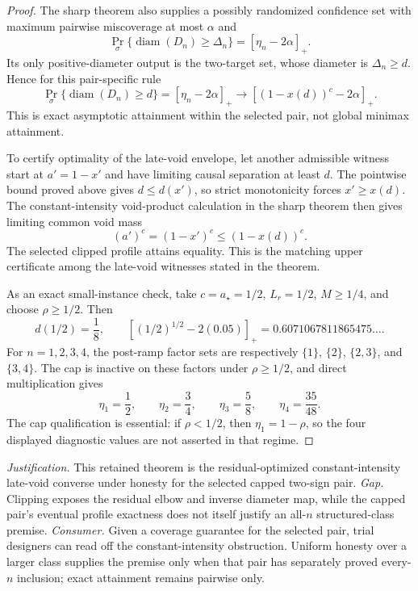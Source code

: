 \documentclass{article}
\begin{document}
\begin{proof}
The sharp theorem also supplies a possibly randomized confidence set with maximum pairwise miscoverage at most \(\alpha\) and
\[
 \Pr_\sigma\{\operatorname{diam}(D_n)\ge\Delta_n\}
 =[\eta_n-2\alpha]_+.
\]
Its only positive-diameter output is the two-target set, whose diameter is \(\Delta_n\ge d\).  Hence for this pair-specific rule
\[
 \Pr_\sigma\{\operatorname{diam}(D_n)\ge d\}
 =[\eta_n-2\alpha]_+
 \longrightarrow[(1-x(d))^c-2\alpha]_+.
\]
This is exact asymptotic attainment within the selected pair, not global minimax attainment.

To certify optimality of the late-void envelope, let another admissible witness start at \(a'=1-x'\) and have limiting causal separation at least \(d\).  The pointwise bound proved above gives \(d\le d(x')\), so strict monotonicity forces \(x'\ge x(d)\).  The constant-intensity void-product calculation in the sharp theorem then gives limiting common void mass
\[
 (a')^c=(1-x')^c\le(1-x(d))^c.
\]
The selected clipped profile attains equality.  This is the matching upper certificate among the late-void witnesses stated in the theorem.

As an exact small-instance check, take \(c=a_\star=1/2\), \(L_r=1/2\), \(M\ge1/4\), and choose \(\rho\ge1/2\).  Then
\[
 d(1/2)=\frac18,
 \qquad
 \left[(1/2)^{1/2}-2(0.05)\right]_+
 =0.6071067811865475\ldots.
\]
For \(n=1,2,3,4\), the post-ramp factor sets are respectively \(\{1\}\), \(\{2\}\), \(\{2,3\}\), and \(\{3,4\}\).  The cap is inactive on these factors under \(\rho\ge1/2\), and direct multiplication gives
\[
 \eta_1=\frac12,
 \qquad \eta_2=\frac34,
 \qquad \eta_3=\frac58,
 \qquad \eta_4=\frac{35}{48}.
\]
The cap qualification is essential: if \(\rho<1/2\), then \(\eta_1=1-\rho\), so the four displayed diagnostic values are not asserted in that regime.
\end{proof}
\par\smallskip\noindent \textit{Justification.} This retained theorem is the residual-optimized constant-intensity late-void converse under honesty for the selected capped two-sign pair. \textit{Gap.} Clipping exposes the residual elbow and inverse diameter map, while the capped pair's eventual profile exactness does not itself justify an all-\(n\) structured-class premise. \textit{Consumer.} Given a coverage guarantee for the selected pair, trial designers can read off the constant-intensity obstruction. Uniform honesty over a larger class supplies the premise only when that pair has separately proved every-\(n\) inclusion; exact attainment remains pairwise only.
\end{document}
